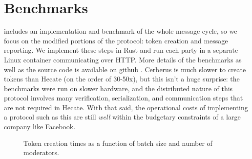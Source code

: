 \documentclass[conference]{IEEEtran}
\begin{document}
\section{Benchmarks}

\textcite{hecate} includes an implementation and benchmark of the whole message cycle, so we focus on the modified portions of the protocol: token creation and message reporting.
We implement these steps in Rust and run each party in a separate Linux container communicating over HTTP. More details of the benchmarks as well as the source code is available on github \cite{cerberus-github}. Cerberus is much slower to create tokens than Hecate (on the order of 30-50x), but this isn't a huge surprise: the benchmarks were run on slower hardware, and the distributed nature of this protocol involves many verification, serialization, and communication steps that are not required in Hecate. With that said, the operational costs of implementing a protocol such as this are still \textit{well} within the budgetary constraints of a large company like Facebook.

\begin{figure}[tb]
	\centering
	\footnotesize
	
	\caption{Token creation times as a function of batch size and number of moderators.}
	\label{fig:token-creation-benchmark}
\end{figure}


\printbibliography
\end{document}
